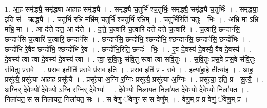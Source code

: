 \documentclass[17pt]{extarticle}
\begin{document}
1. आ॒ह॒ समृ॑द्ध्यै॒ समृ॑द्ध्या आहाह॒ समृ॑द्ध्यै । . समृ॑द्ध्यै च॒तुर्भि॑ श्च॒तुर्भिः॒ समृ॑द्ध्यै॒ समृ॑द्ध्यै च॒तुर्भिः॑ । . समृ॑द्ध्या॒ इति॒ सं - ऋ॒द्ध्यै॒ । . च॒तुर्भि॒ रभ्रि॒ मभ्रि॑म् च॒तुर्भि॑ श्च॒तुर्भि॒ रभ्रि᳚म् । . च॒तुर्भि॒रिति॑ च॒तुः - भिः॒ । . अभ्रि॒ मा ऽभ्रि॒ मभ्रि॒ मा । . आ द॑त्ते दत्त॒ आ द॑त्ते । . द॒त्ते॒ च॒त्वारि॑ च॒त्वारि॑ दत्ते दत्ते च॒त्वारि॑ । . च॒त्वारि॒ छन्दाꣳ॑सि॒ छन्दाꣳ॑सि च॒त्वारि॑ च॒त्वारि॒ छन्दाꣳ॑सि । . छन्दाꣳ॑सि॒ छन्दो॑भि॒ श्छन्दो॑भि॒ श्छन्दाꣳ॑सि॒ छन्दाꣳ॑सि॒ छन्दो॑भिः । . छन्दो॑भि रे॒वैव छन्दो॑भि॒ श्छन्दो॑भि रे॒व । . छन्दो॑भि॒रिति॒ छन्दः॑ - भिः॒ । . ए॒व दे॒वस्य॑ दे॒वस्यै॒ वैव दे॒वस्य॑ । . दे॒वस्य॑ त्वा त्वा दे॒वस्य॑ दे॒वस्य॑ त्वा । . त्वा॒ स॒वि॒तुः स॑वि॒तु स्त्वा᳚ त्वा सवि॒तुः । . स॒वि॒तुः प्र॑स॒वे प्र॑स॒वे स॑वि॒तुः स॑वि॒तुः प्र॑स॒वे । . प्र॒स॒व इतीति॑ प्रस॒वे प्र॑स॒व इति॑ । . प्र॒स॒व इति॑ प्र - स॒वे । . इत्या॑हा॒हे तीत्या॑ह । . आ॒ह॒ प्रसू᳚त्यै॒ प्रसू᳚त्या आहाह॒ प्रसू᳚त्यै । . प्रसू᳚त्या अ॒ग्नि र॒ग्निः प्रसू᳚त्यै॒ प्रसू᳚त्या अ॒ग्निः । . प्रसू᳚त्या॒ इति॒ प्र - सू॒त्यै॒ । . अ॒ग्निर् दे॒वेभ्यो॑ दे॒वेभ्यो॒ ऽग्नि र॒ग्निर् दे॒वेभ्यः॑ । . दे॒वेभ्यो॒ निला॑यत॒ निला॑यत दे॒वेभ्यो॑ दे॒वेभ्यो॒ निला॑यत । . निला॑यत॒ स स निला॑यत॒ निला॑यत॒ सः । . स वेणुं॒ ॅवेणुꣳ॒॒ स स वेणु᳚म् । . वेणु॒म् प्र प्र वेणुं॒ ॅवेणु॒म् प्र । \newline
\end{document}
